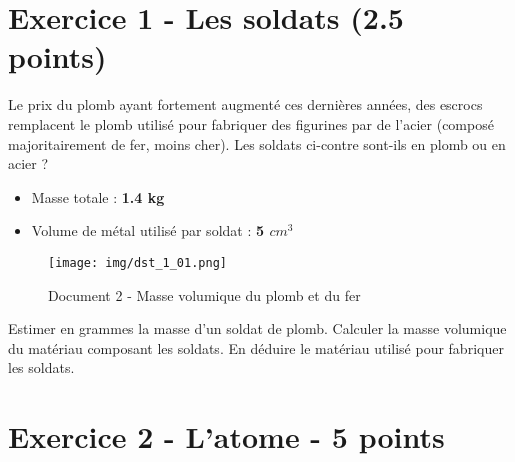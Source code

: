 \documentclass[answers]{exam}
\begin{document}
\section*{Exercice 1 - Les soldats (2.5 points)}

Le prix du plomb ayant fortement augmenté ces dernières années, des escrocs remplacent le plomb utilisé pour fabriquer des figurines par de l'acier (composé majoritairement de fer, moins cher). Les soldats ci-contre sont-ils en plomb ou en acier ?


\begin{tcolorbox}[colback=gray!10!white, colframe=gray, title=Document 1 - Caractéristiques d'un lot de \textbf{25} soldats de plomb]
  \begin{itemize}[noitemsep]
    \item Masse totale : \textbf{1.4 kg}
    \item Volume de métal utilisé par soldat : \textbf{5 $cm^3$}
  \end{itemize}
\end{tcolorbox}

\begin{figure}[H]
  \centering
  \texttt{[image: img/dst\_1\_01.png]}
  \captionsetup{labelformat=empty}
  \caption{\label{} Document 2 - Masse volumique du plomb et du fer}
\end{figure} 


\begin{questions}
  \question[1] Estimer en grammes la masse d'un soldat de plomb.
  \question[1] Calculer la masse volumique du matériau composant les soldats.
  \question[0.5] En déduire le matériau utilisé pour fabriquer les soldats.
\end{questions}

\section*{Exercice 2 - L'atome - 5 points}
\end{document}
